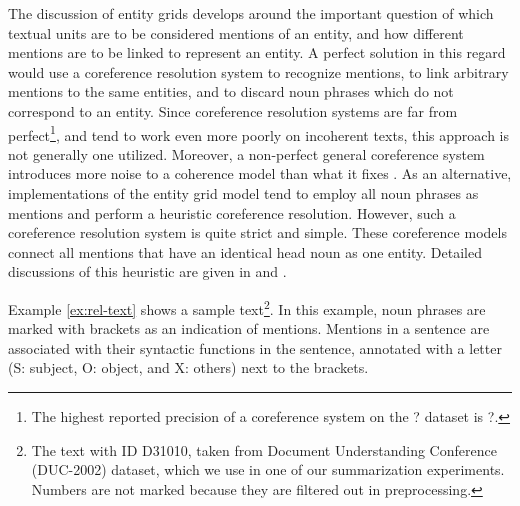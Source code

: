 The discussion of entity grids develops around the important question of which textual units are to be considered mentions of an entity, and how different mentions are to be linked to represent an entity. 
A perfect solution in this regard would use a coreference resolution system to recognize mentions, to link arbitrary mentions to the same entities, and to discard noun phrases which do not correspond to an entity. 
Since coreference resolution systems are far from perfect\footnote{The highest reported precision of a coreference system on the ? dataset is ?.}, and tend to work even more poorly on incoherent texts, this approach is not generally one utilized.  
Moreover, a non-perfect general coreference system introduces more noise to a coherence model than what it fixes \cite{barzilay08}.  
As an alternative, implementations of the entity grid model tend to employ all noun phrases as mentions and perform a heuristic coreference resolution. 
However, such a coreference resolution system is quite strict and simple. 
These coreference models connect all mentions that have an identical head noun as one entity. 
Detailed discussions of this heuristic are given in  and . 

Example \ref{ex:rel-text} shows a sample text\footnote{The text with ID D31010, taken from Document Understanding Conference (DUC-2002) dataset, which we use in one of our summarization experiments. Numbers are not marked because they are filtered out in preprocessing.}.  
In this example, noun phrases are marked with brackets as an indication of mentions. 
Mentions in a sentence are associated with their syntactic functions in the sentence, annotated with a letter (S: subject, O: object, and X: others) next to the brackets. 

